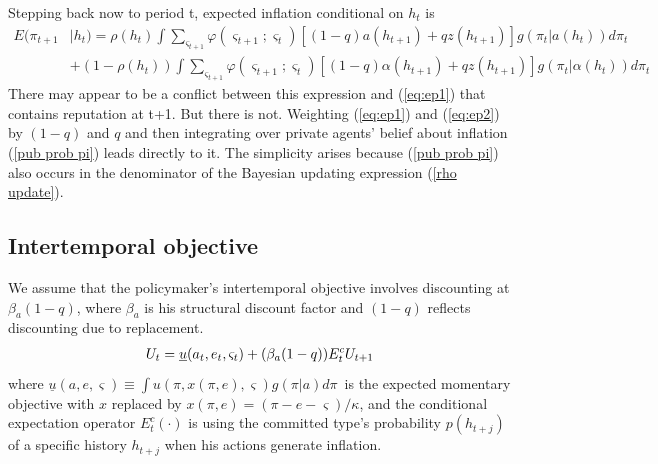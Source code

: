 \documentclass[12pt,letter,leqno]{article}
\theoremstyle{asn}
\theoremstyle{lem}
\theoremstyle{slem}
\theoremstyle{prop}
\theoremstyle{appprop}
\theoremstyle{rem}
\theoremstyle{defn}
\begin{document}
Stepping back now to period t, expected inflation conditional on $h_{t}$ is  
\begin{align}
E(\pi _{t+1}&|h_{t}) =\rho (h_{t})\int \sum_{\varsigma _{t+1}}\varphi (\varsigma
_{t+1};\varsigma _{t})\left[ \left( 1-q\right) a(h_{t+1})+qz\left(
h_{t+1}\right) \right] g(\pi_t |a(h_{t}))d\pi_t  \label{appEpi}\\
&+\left( 1-\rho \left( h_{t}\right) \right) \int \sum_{\varsigma
_{t+1}}\varphi (\varsigma _{t+1};\varsigma _{t})\left[ \left( 1-q\right)
\alpha (h_{t+1})+qz\left( h_{t+1}\right) \right] g(\pi_t |\alpha
(h_{t}))d\pi_t \nonumber
\end{align}
There may appear to be a conflict between this expression and (\ref{eq:ep1}) that contains reputation at t+1. But there is not. Weighting (\ref{eq:ep1}) and (\ref{eq:ep2}) by $(1-q)$ and $q$ and then integrating over private agents' belief about inflation (\ref{pub prob pi}) leads directly to it. The simplicity arises because (\ref{pub prob pi}) also occurs in the denominator of the Bayesian updating expression (\ref{rho update}).  

\subsection{Intertemporal objective}\label{appsec:recursive6}

We assume that the policymaker's intertemporal objective involves
discounting at $\beta_{a}(1-q)$, where $\beta_{a}$ is his structural
discount factor and $(1-q)$ reflects discounting due to replacement. \
\begin{eqnarray*}
U_{t} = \uline{u}(a_{t},e_{t},\varsigma _{t})+(\beta_{a}(1-q))E^c_{t}U_{t+1}
\end{eqnarray*}%
where $\underline{u}\left (a ,e,\varsigma \right) \equiv \int u\left(
\pi, x(\pi,e) ,\varsigma\right) g\left( \pi
|a\right) d\pi$\ is the expected momentary objective
with $x$ replaced by $x(\pi,e)=\left( \pi -e-\varsigma \right)/\kappa$, and the
conditional expectation operator $E^c_t(\cdot)$ is using the committed type's probability $p(h_{t+j})$ of a specific history $h_{t+j}$ when his actions generate inflation. 
\end{document}
